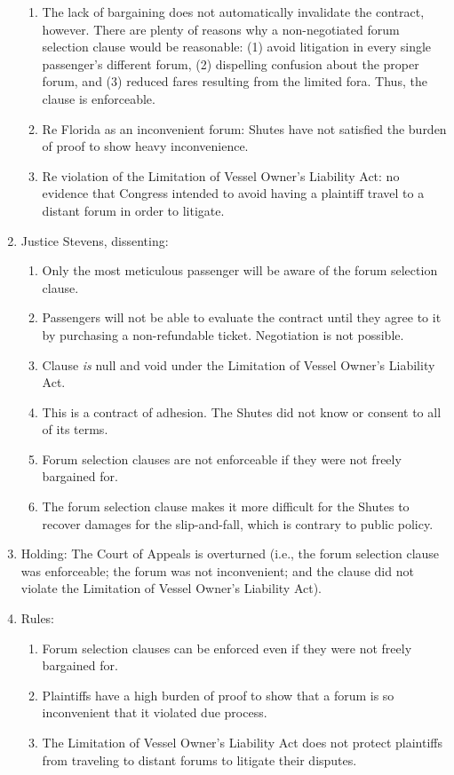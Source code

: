 \begin{enumerate}
\begin{enumerate}
        \item The lack of bargaining does not automatically invalidate the contract, however. There are plenty of reasons why a non-negotiated forum selection clause would be reasonable: (1) avoid litigation in every single passenger's different forum, (2) dispelling confusion about the proper forum, and (3) reduced fares resulting from the limited fora. Thus, the clause is enforceable.
        \item Re Florida as an inconvenient forum: Shutes have not satisfied the burden of proof to show heavy inconvenience.
        \item Re violation of the Limitation of Vessel Owner's Liability Act: no evidence that Congress intended to avoid having a plaintiff travel to a distant forum in order to litigate.
    \end{enumerate}
    \item Justice Stevens, dissenting:
    \begin{enumerate}
        \item Only the most meticulous passenger will be aware of the forum selection clause.
        \item Passengers will not be able to evaluate the contract until they agree to it by purchasing a non-refundable ticket. Negotiation is not possible.
        \item Clause \emph{is} null and void under the Limitation of Vessel Owner's Liability Act.
        \item This is a contract of adhesion. The Shutes did not know or consent to all of its terms.
        \item Forum selection clauses are not enforceable if they were not freely bargained for.
        \item The forum selection clause makes it more difficult for the Shutes to recover damages for the slip-and-fall, which is contrary to public policy.
    \end{enumerate}
    \item Holding: The Court of Appeals is overturned (i.e., the forum selection clause was enforceable; the forum was not inconvenient; and the clause did not violate the Limitation of Vessel Owner's Liability Act).
    \item Rules:
    \begin{enumerate}
        \item Forum selection clauses can be enforced even if they were not freely bargained for.
        \item Plaintiffs have a high burden of proof to show that a forum is so inconvenient that it violated due process.
        \item The Limitation of Vessel Owner's Liability Act does not protect plaintiffs from traveling to distant forums to litigate their disputes.
    \end{enumerate}
\end{enumerate}

